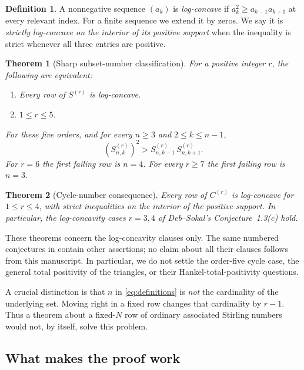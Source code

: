 \documentclass[11pt,a4paper]{article}
\numberwithin{equation}{section}
\newtheorem{theorem}{Theorem}[section]
\theoremstyle{definition}
\newtheorem{definition}[definition]{Definition}
\theoremstyle{remark}
\newcommand{\Snum}[3]{S^{(#1)}_{#2,#3}}
\begin{document}
\begin{definition}
A nonnegative sequence $(a_k)$ is \emph{log-concave} if
$a_k^2\ge a_{k-1}a_{k+1}$ at every relevant index. For a finite sequence
we extend it by zeros. We say it is \emph{strictly log-concave on the
interior of its positive support} when the inequality is strict whenever
all three entries are positive.
\end{definition}

\begin{theorem}[Sharp subset-number classification]\label{thm:main}
For a positive integer $r$, the following are equivalent:
\begin{enumerate}[label=(\roman*),nosep]
\item Every row of $S^{(r)}$ is log-concave.
\item $1\le r\le5$.
\end{enumerate}
For these five orders, and for every $n\ge3$ and $2\le k\le n-1$,
\begin{equation}\label{eq:main-strict}
 (\Snum r n k)^2>\Snum r n {k-1}\,\Snum r n {k+1}.
\end{equation}
For $r=6$ the first failing row is $n=4$. For every $r\ge7$ the first
failing row is $n=3$.
\end{theorem}

\begin{theorem}[Cycle-number consequence]\label{thm:cycles}
Every row of $C^{(r)}$ is log-concave for $1\le r\le4$, with strict
inequalities on the interior of the positive support. In particular,
the log-concavity cases $r=3,4$ of Deb--Sokal's Conjecture~1.3(c) hold.
\end{theorem}

These theorems concern the log-concavity clauses only. The same numbered
conjectures in \cite{DebSokal} contain other assertions; no claim about
all their clauses follows from this manuscript. In particular, we do not
settle the order-five cycle case, the general total positivity of the
triangles, or their Hankel-total-positivity questions.

A crucial distinction is that $n$ in \eqref{eq:definitions} is \emph{not}
the cardinality of the underlying set. Moving right in a fixed row changes
that cardinality by $r-1$. Thus a theorem about a fixed-$N$ row of ordinary
associated Stirling numbers would not, by itself, solve this problem.

\subsection{What makes the proof work}
\end{document}
